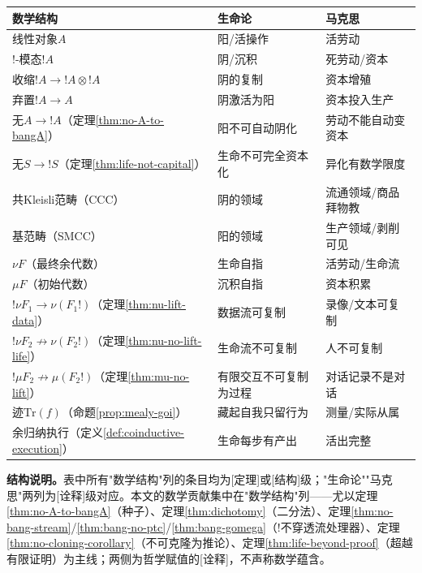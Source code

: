 \documentclass[11pt,a4paper]{article}
\newcommand{\bang}{{!}}
\newcommand{\tensor}{\otimes}
\newcommand{\mU}{\mu}
\newcommand{\mN}{\nu}
\begin{document}
\begin{center}
\begin{tabular}{lll}
\hline
\textbf{数学结构} & \textbf{生命论} & \textbf{马克思} \\
\hline
线性对象$A$ & 阳/活操作 & 活劳动 \\
$\bang$-模态$\bang A$ & 阴/沉积 & 死劳动/资本 \\
收缩$\bang A\to\bang A\tensor\bang A$ & 阴的复制 & 资本增殖 \\
弃置$\bang A\to A$ & 阴激活为阳 & 资本投入生产 \\
无$A\to\bang A$（定理\ref{thm:no-A-to-bangA}） & 阳不可自动阴化 & 劳动不能自动变资本 \\
无$S\to\bang S$（定理\ref{thm:life-not-capital}） & 生命不可完全资本化 & 异化有数学限度 \\
共Kleisli范畴（CCC） & 阴的领域 & 流通领域/商品拜物教 \\
基范畴（SMCC） & 阳的领域 & 生产领域/剥削可见 \\
$\mN F$（最终余代数） & 生命自指 & 活劳动/生命流 \\
$\mU F$（初始代数） & 沉积自指 & 资本积累 \\
$\bang\nu F_1\to\nu(F_1\bang)$（定理\ref{thm:nu-lift-data}） & 数据流可复制 & 录像/文本可复制 \\
$\bang\nu F_2\not\to\nu(F_2\bang)$（定理\ref{thm:nu-no-lift-life}） & 生命流不可复制 & 人不可复制 \\
$\bang\mu F_2\not\to\mu(F_2\bang)$（定理\ref{thm:mu-no-lift}） & 有限交互不可复制为过程 & 对话记录不是对话 \\
迹$\mathrm{Tr}(f)$（命题\ref{prop:mealy-goi}） & 藏起自我只留行为 & 测量/实际从属 \\
余归纳执行（定义\ref{def:coinductive-execution}） & 生命每步有产出 & 活出完整 \\
\hline
\end{tabular}
\end{center}

\vspace{1em}
\noindent\textbf{结构说明。}表中所有"数学结构"列的条目均为[定理]或[结构]级；"生命论""马克思"两列为[诠释]级对应。本文的数学贡献集中在"数学结构"列——尤以定理\ref{thm:no-A-to-bangA}（种子）、定理\ref{thm:dichotomy}（二分法）、定理\ref{thm:no-bang-stream}/\ref{thm:bang-no-ptc}/\ref{thm:bang-gomega}（$\bang$不穿透流处理器）、定理\ref{thm:no-cloning-corollary}（不可克隆为推论）、定理\ref{thm:life-beyond-proof}（超越有限证明）为主线；两侧为哲学赋值的[诠释]，不声称数学蕴含。
\end{document}
